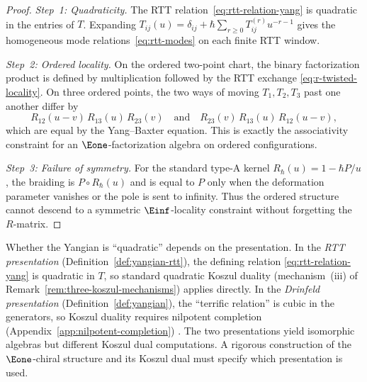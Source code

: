 \begin{proof}
\emph{Step~1: Quadraticity.}
The RTT relation~\eqref{eq:rtt-relation-yang} is quadratic in the entries
of $T$.  Expanding
$T_{ij}(u)=\delta_{ij}+\hbar\sum_{r\ge0}T_{ij}^{(r)}u^{-r-1}$
gives the homogeneous mode relations~\eqref{eq:rtt-modes} on each
finite RTT window.

\emph{Step~2: Ordered locality.}
On the ordered two-point chart, the binary factorization product is
defined by multiplication followed by the RTT exchange
\eqref{eq:r-twisted-locality}.  On three ordered points, the two
ways of moving $T_1,T_2,T_3$ past one another differ by
\[
R_{12}(u{-}v)\,R_{13}(u)\,R_{23}(v)
\quad\text{and}\quad
R_{23}(v)\,R_{13}(u)\,R_{12}(u{-}v),
\]
which are equal by the Yang--Baxter equation.  This is exactly the
associativity constraint for an $\Eone$-factorization algebra on
ordered configurations.

\emph{Step~3: Failure of symmetry.}
For the standard type-A kernel $R_\hbar(u)=1-\hbar P/u$, the
braiding is $P\circ R_\hbar(u)$ and is equal to $P$ only when the
deformation parameter vanishes or the pole is sent to infinity.
Thus the ordered structure cannot descend to a symmetric
$\Einf$-locality constraint without forgetting the $R$-matrix.
\end{proof}

\begin{remark}\label{rem:yangian-presentations}
Whether the Yangian is ``quadratic'' depends on the presentation. In the \emph{RTT presentation} (Definition~\ref{def:yangian-rtt}), the defining relation \eqref{eq:rtt-relation-yang} is quadratic in $T$, so standard quadratic Koszul duality (mechanism~(iii) of Remark~\ref{rem:three-koszul-mechanisms}) applies directly. In the \emph{Drinfeld presentation} (Definition~\ref{def:yangian}), the ``terrific relation'' is cubic in the generators, so Koszul duality requires nilpotent completion \ifannalsedition\else
(Appendix~\ref{app:nilpotent-completion})
\fi.
The two presentations yield isomorphic algebras but different Koszul dual
computations. A rigorous construction of the $\Eone$-chiral structure and its
Koszul dual must specify which presentation is used.
\end{remark}

